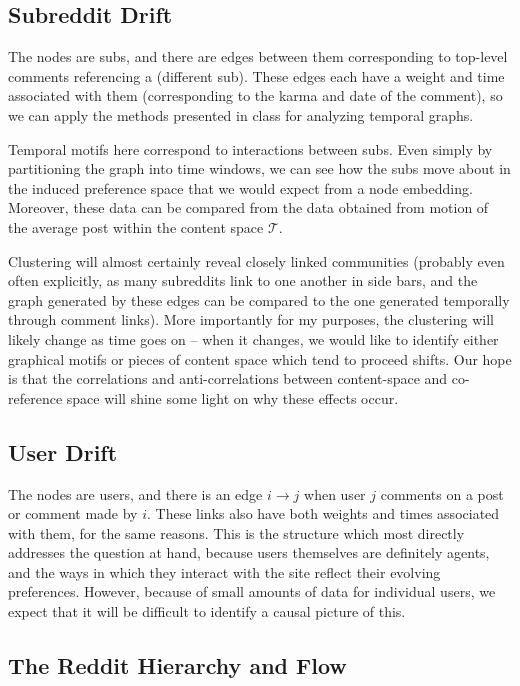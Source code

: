 \documentclass{amsart}
\begin{document}
	\subsection{Subreddit Drift}
	The nodes are subs, and there are edges between them corresponding to top-level comments referencing a (different sub). These edges each have a weight and time associated with them (corresponding to the karma and date of the comment), so we can apply the methods presented in class for analyzing temporal graphs.
	
	Temporal motifs here correspond to interactions between subs. Even simply by partitioning the graph into time windows, we can see how the subs move about in the induced preference space that we would expect from a node embedding. Moreover, these data can be compared from the data obtained from motion of the average post within the content space $\mathcal T$.
	
	Clustering will almost certainly reveal closely linked communities (probably even often explicitly, as many subreddits link to one another in side bars, and the graph generated by these edges can be compared to the one generated temporally through comment links). More importantly for my purposes, the clustering will likely change as time goes on -- when it changes, we would like to identify either graphical motifs or pieces of content space which tend to proceed shifts. Our hope is that the correlations and anti-correlations between content-space and co-reference space will shine some light on why these effects occur.
	
	\subsection{User Drift}
	The nodes are users, and there is an edge $i \to j$ when user $j$ comments on a post or comment made by $i$. These links also have both weights and times associated with them, for the same reasons. This is the structure which most directly addresses the question at hand, because users themselves are definitely agents, and the ways in which they interact with the site reflect their evolving preferences. However, because of small amounts of data for individual users, we expect that it will be difficult to identify a causal picture of this.
	
	\subsection{The Reddit Hierarchy and Flow}
	
\end{document}
